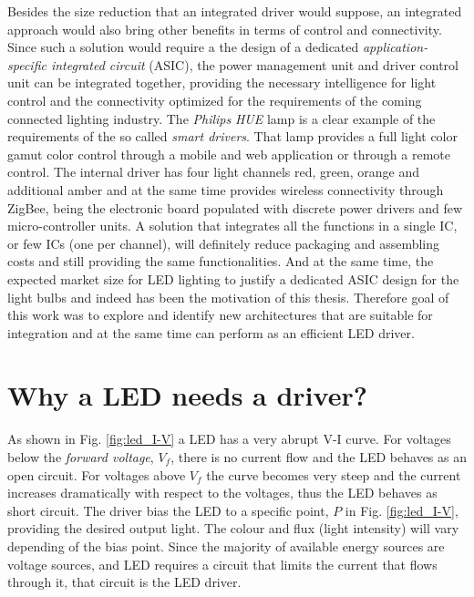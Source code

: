 Besides the size reduction that an integrated driver would suppose, an integrated approach would also bring other benefits in terms of control and connectivity. Since such a solution would require a the design of a dedicated \emph{application-specific integrated circuit} (ASIC), the power management unit and driver control unit can be integrated together, providing the necessary intelligence for light control and the connectivity optimized for the requirements of the coming connected lighting industry. The \emph{Philips} \emph{HUE} lamp is a clear example of the requirements of the so called \emph{smart drivers}. That lamp provides a full light color gamut color control through a mobile and web application or through a remote control. The internal driver has four light channels red, green, orange and additional amber and at the same time provides wireless connectivity through ZigBee, being the electronic board populated with discrete power drivers and few micro-controller units. A solution that integrates all the functions in a single IC, or few ICs (one per channel), will definitely reduce packaging and assembling costs and still providing the same functionalities. And at the same time, the expected market size for LED lighting to justify a dedicated ASIC design for the light bulbs and indeed has been the motivation of this thesis. Therefore goal of this work was to explore and identify new architectures that are suitable for integration and at the same time can perform as an efficient LED driver.


\section{Why a LED needs a driver?}

As shown in Fig. \ref{fig:led_I-V} a LED has a very abrupt V-I curve. For voltages below the \emph{forward voltage}, $V_{f}$, there is no current flow and the LED behaves as an open circuit. For voltages above $V_{f}$ the curve becomes very steep and the current increases dramatically with respect to the voltages, thus the LED behaves as short circuit. The driver bias the LED to a specific point, $P$ in Fig. \ref{fig:led_I-V}, providing the desired output light. The colour and flux (light intensity) will vary depending of the bias point.  Since the majority of  available  energy sources are  voltage sources, and LED requires a circuit that limits the current that flows through it, that circuit is the LED driver.

